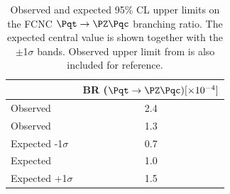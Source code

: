 \begin{table}[htbp]
	\centering
	\begin{tabular}{lc} 
		\toprule
		 								& BR ($\Pqt\rightarrow\PZ\Pqc) [\times 10^{-4}]$  \\
		\midrule
		Observed \cite{TOPQ-2017-06} 	 & 2.4 \\
		Observed  				   					& 1.3  \\
		Expected -1$\sigma$   				  &   0.7 \\
		Expected                    				&  1.0 \\
	    Expected +1$\sigma$  				 &  1.5 \\		
		\bottomrule
	\end{tabular}
	\caption{
		Observed and expected 95\% CL upper limits on the FCNC $\Pqt\rightarrow\PZ\Pqc$ branching ratio. 
		The expected central value is shown together with the $\pm$1$\sigma$ bands.
		Observed upper limit from \cite{TOPQ-2017-06} is also included for reference.
	}%
	\label{tab:results:limits}
\end{table}

